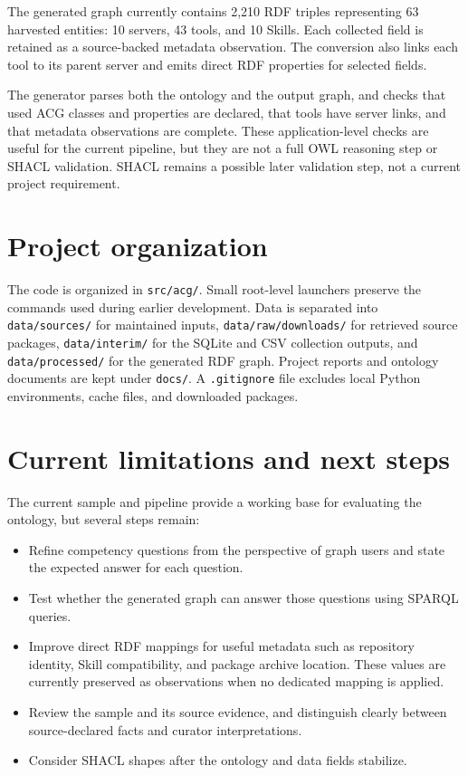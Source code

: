\documentclass[11pt,a4paper]{article}
\begin{document}
The generated graph currently contains 2,210 RDF triples representing 63
harvested entities: 10 servers, 43 tools, and 10 Skills. Each collected field is
retained as a source-backed metadata observation. The conversion also links each
tool to its parent server and emits direct RDF properties for selected fields.

The generator parses both the ontology and the output graph, and checks that
used ACG classes and properties are declared, that tools have server links, and
that metadata observations are complete. These application-level checks are
useful for the current pipeline, but they are not a full OWL reasoning step or
SHACL validation. SHACL remains a possible later validation step, not a current
project requirement.

\section{Project organization}

The code is organized in \texttt{src/acg/}. Small root-level launchers preserve
the commands used during earlier development. Data is separated into
\texttt{data/sources/} for maintained inputs,
\texttt{data/raw/downloads/} for retrieved source packages,
\texttt{data/interim/} for the SQLite and CSV collection outputs, and
\texttt{data/processed/} for the generated RDF graph. Project reports and
ontology documents are kept under \texttt{docs/}. A \texttt{.gitignore} file
excludes local Python environments, cache files, and downloaded packages.

\section{Current limitations and next steps}

The current sample and pipeline provide a working base for evaluating the
ontology, but several steps remain:

\begin{itemize}
  \item Refine competency questions from the perspective of graph users and
  state the expected answer for each question.
  \item Test whether the generated graph can answer those questions using
  SPARQL queries.
  \item Improve direct RDF mappings for useful metadata such as repository
  identity, Skill compatibility, and package archive location. These values are
  currently preserved as observations when no dedicated mapping is applied.
  \item Review the sample and its source evidence, and distinguish clearly
  between source-declared facts and curator interpretations.
  \item Consider SHACL shapes after the ontology and data fields stabilize.
\end{itemize}
\end{document}
